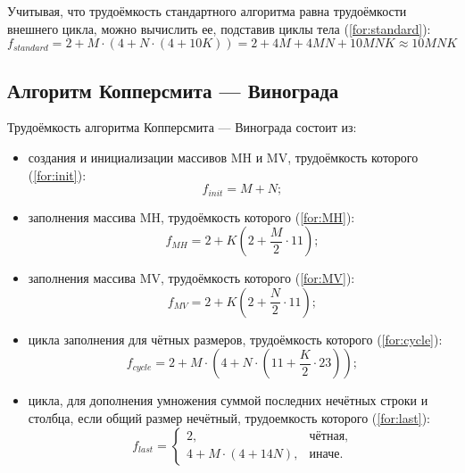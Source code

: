 \documentclass[a4paper,14pt, unknownkeysallowed]{extreport}
\begin{document}
Учитывая, что трудоёмкость стандартного алгоритма равна трудоёмкости внешнего цикла, можно вычислить ее, подставив циклы тела (\ref{for:standard}):
\begin{equation}
	\label{for:standard}
	f_{standard} = 2 + M \cdot (4 + N \cdot (4 + 10K)) = 2 + 4M + 4MN + 10MNK \approx 10MNK
\end{equation}

\subsection{Алгоритм Копперсмита — Винограда}

Трудоёмкость алгоритма Копперсмита — Винограда состоит из:
\begin{itemize}
	\item создания и инициализации массивов MH и MV, трудоёмкость которого (\ref{for:init}):
	\begin{equation}
		\label{for:init}
		f_{init} = M + N;
	\end{equation}
	
	\item заполнения массива MH, трудоёмкость которого (\ref{for:MH}):
	\begin{equation}
		\label{for:MH}
		f_{MH} = 2 + K (2 + \frac{M}{2} \cdot 11);
	\end{equation}
	
	\item заполнения массива MV, трудоёмкость которого (\ref{for:MV}):
	\begin{equation}
		\label{for:MV}
		f_{MV} = 2 + K (2 + \frac{N}{2} \cdot 11);
	\end{equation}
	
	\item цикла заполнения для чётных размеров, трудоёмкость которого (\ref{for:cycle}):
	\begin{equation}
		\label{for:cycle}
		f_{cycle} = 2 + M \cdot (4 + N \cdot (11 + \frac{K}{2} \cdot 23));
	\end{equation}
	
	\item цикла, для дополнения умножения суммой последних нечётных строки и столбца, если общий размер нечётный, трудоемкость которого (\ref{for:last}):
	\begin{equation}
		\label{for:last}
		f_{last} = \begin{cases}
			2, & \text{чётная,}\\
			4 + M \cdot (4 + 14N), & \text{иначе.}
		\end{cases}
	\end{equation}
\end{itemize}
\end{document}
